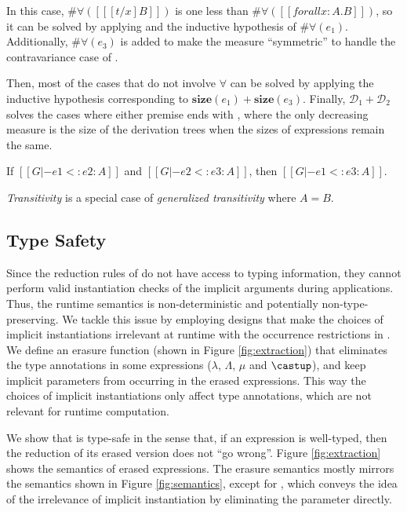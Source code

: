 \noindent In this case, $\#\forall({[[ [t / x] B]]})$ is one
less than $\#\forall([[forall x : A. B]])$,
so it can be solved by applying  and the
inductive hypothesis of $\#\forall(e_1)$.
Additionally, $\#\forall(e_3)$ is added to make the measure ``symmetric''
to handle the contravariance case of .

Then, most of the cases that do not involve $\forall$ can be
solved by applying the inductive hypothesis corresponding to
$\mathbf{size}(e_1) + \mathbf{size}(e_3)$.
Finally, $\mathcal{D}_1 + \mathcal{D}_2$ solves
the cases where either premise ends with , where the only decreasing
measure is the size of the derivation trees when the sizes of expressions remain
the same.

\begin{corollary}[Transitivity]
    If $[[G |- e1 <: e2 : A]]$ and $[[G |- e2 <: e3 : A]]$,
    then $[[G |- e1 <: e3 : A]]$.
\end{corollary}

\emph{Transitivity} is a special case of \emph{generalized transitivity} where $A = B$.

\subsection{Type Safety}
\label{sec:type-safety}

Since the reduction rules of \name do not have access to typing information, they
cannot perform valid instantiation checks of the implicit arguments during applications.
Thus, the runtime semantics is non-deterministic and potentially non-type-preserving.
We tackle this issue by employing designs that make the choices of implicit instantiations
irrelevant at runtime with the occurrence restrictions in .
We define an erasure function (shown in Figure \ref{fig:extraction})
that eliminates the type annotations
in some expressions ($\lambda$, $\Lambda$, $\mu$ and $\castup$),
and keep implicit parameters from occurring in the erased expressions.
This way the choices of implicit instantiations only affect type annotations,
which are not relevant for runtime computation.

We show that \name is type-safe in the sense that,
if an expression is well-typed, then the reduction of its erased version
does not ``go wrong''. Figure \ref{fig:extraction} shows the semantics of
erased expressions. The erasure semantics mostly mirrors the semantics
shown in Figure \ref{fig:semantics}, except for , which
conveys the idea of the irrelevance of implicit instantiation by eliminating the
parameter directly.

